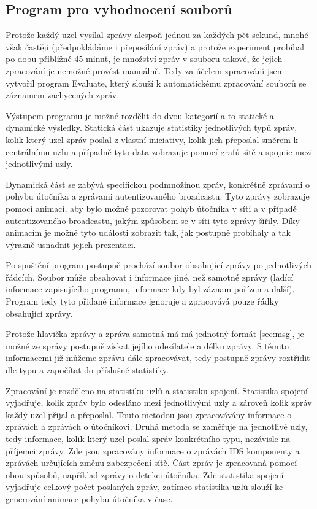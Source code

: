 \documentclass[11pt,final,twoside]{fithesis2}
\begin{document}
\subsection{Program pro vyhodnocení souborů}
Protože každý uzel vysílal zprávy alespoň jednou za každých pět sekund, mnohé však častěji (předpokládáme i přeposílání zpráv) a protože experiment probíhal po dobu 
přibližně 45 minut, je množství zpráv v souboru takové, že jejich zpracování je nemožné provést manuálně. Tedy za účelem zpracování 
jsem vytvořil program Evaluate, který slouží k automatickému zpracování souborů se záznamem zachycených zpráv. 

Výstupem programu je možné rozdělit do dvou kategorií a to statické a dynamické výsledky. Statická část ukazuje statistiky jednotlivých 
typů zpráv, kolik který uzel zpráv poslal z vlastní iniciativy, kolik jich přeposlal směrem k centrálnímu uzlu a případně tyto data 
zobrazuje pomocí grafů sítě a spojnic mezi jednotlivými uzly. 

Dynamická část se zabývá specifickou podmnožinou zpráv, konkrétně zprávami o pohybu útočníka a zprávami autentizovaného broadcastu. 
Tyto zprávy zobrazuje pomocí animací, aby bylo možné pozorovat pohyb útočníka v síti a v případě autentizovaného broadcastu, jakým 
způsobem se v síti tyto zprávy šířily. Díky animacím je možné tyto události zobrazit tak, jak postupně probíhaly a tak výrazně usnadnit 
jejich prezentaci. 

Po spuštění program postupně prochází soubor obsahující zprávy po jednotlivých řádcích. Soubor může obsahovat i informace jiné, než 
samotné zprávy (ladící informace zapisujícího programu, informace kdy byl záznam pořízen a další). Program tedy tyto přidané informace
ignoruje a zpracovává pouze řádky obsahující zprávy.

Protože hlavička zprávy a zpráva samotná má má jednotný formát \ref{sec:msg}, je možné ze správy postupně získat jejího odesílatele a délku zprávy. S těmito informacemi již můžeme zprávu dále zpracovávat, 
tedy postupně zprávy roztřídit dle typu a započítat do příslušné statistiky. 

Zpracování je rozděleno na statistiku uzlů a statistiku spojení. Statistika spojení vyjadřuje, kolik zpráv bylo odesláno mezi jednotlivými uzly a zároveň kolik zpráv každý uzel přijal a přeposlal. 
Touto metodou jsou zpracovávány informace o  zprávách a zprávách o útočníkovi. Druhá metoda se zaměřuje na jednotlivé uzly, tedy informace, kolik který uzel poslal zpráv konkrétního typu, 
nezávisle na příjemci zprávy. Zde jsou zpracovány informace o zprávách IDS komponenty a zprávách určujících změnu zabezpečení sítě. Část zpráv je zpracovaná pomocí obou způsobů, například zprávy o detekci
útočníka. Zde statistika spojení vyjadřuje celkový počet poslaných zpráv, zatímco statistika uzlů slouží ke generování animace pohybu útočníka v čase.
\end{document}
